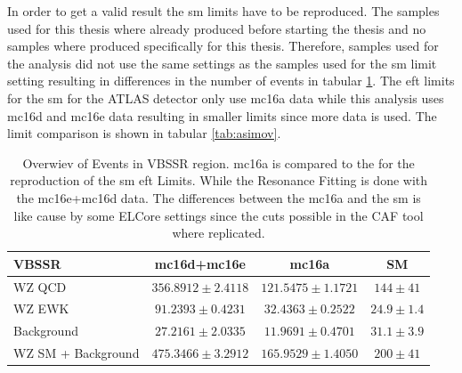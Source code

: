 \documentclass[../Bachelorarbeit.tex]{subfiles}
\begin{document}
In order to get a valid result the \acrshort{sm} limits have to be reproduced. The samples used for this thesis where already produced before starting the thesis and no samples where produced specifically for this thesis.
Therefore, samples used for the analysis did not use the same settings as the samples used for the \acrshort{sm} limit setting resulting in differences in the number of events in tabular \ref{tab:SM_re}.
The \acrshort{eft} limits for the \acrshort{sm} for the ATLAS detector only use mc16a data while this analysis uses mc16d and mc16e data resulting in smaller limits since more data is used.
The limit comparison is shown in tabular \ref{tab:asimov}.


\begin{table}[h]
    \centering
    \begin{tabular}{ l c c c }
        \hline
        VBSSR              & mc16d+mc16e           & mc16a                 & SM             \\
        \hline
        WZ QCD             & $356.8912 \pm 2.4118$ & $121.5475 \pm 1.1721$ & $144 \pm 41$   \\
        WZ EWK             & $91.2393 \pm 0.4231$  & $32.4363 \pm 0.2522$  & $24.9 \pm 1.4$ \\
        Background         & $27.2161 \pm 2.0335$  & $11.9691 \pm 0.4701$  & $31.1 \pm 3.9$ \\
        \hline
        WZ SM + Background & $475.3466 \pm 3.2912$ & $165.9529 \pm 1.4050$ & $200 \pm 41$   \\
        \hline
    \end{tabular}
    \caption{Overwiev of Events in VBSSR region. mc16a is compared to the \cite{Sampsonidou.25.11.2021} for the reproduction of the \acrshort{sm} \acrshort{eft} Limits.
        While the Resonance Fitting is done with the mc16e+mc16d data. The differences between the mc16a and the \acrshort{sm} is like cause by some ELCore settings
        since the cuts possible in the CAF tool where replicated.}
    \label{tab:SM_re}
\end{table}
\end{document}
